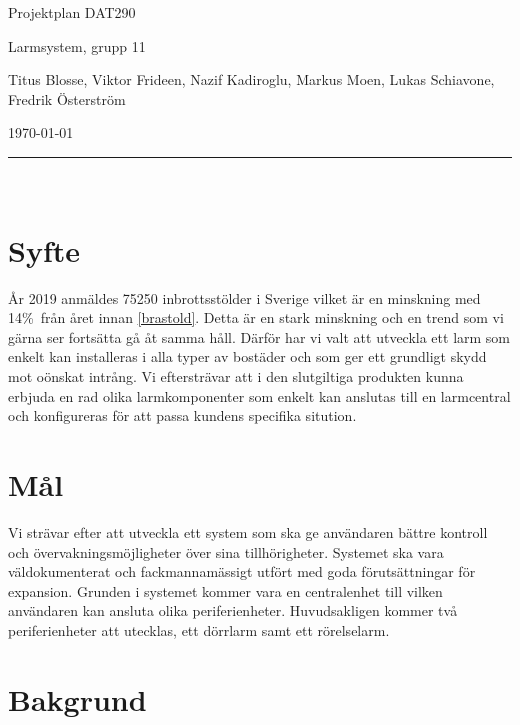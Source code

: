 \documentclass{article}
\begin{document}
\begin{center}
\thispagestyle{empty}
\parskip=14pt%
\vspace*{3\parskip}%

{\LARGE Projektplan DAT290}

{\large Larmsystem, grupp 11

Titus Blosse, Viktor Frideen, Nazif Kadiroglu, Markus Moen, Lukas Schiavone, Fredrik Österström

\today}


\rule{7cm}{0.4pt}\\
\end{center}
\newpage

\thispagestyle{empty}
\tableofcontents
\newpage


\section{Syfte}

År 2019 anmäldes 75250  inbrottsstölder i Sverige vilket är en minskning med 14\%\ från året innan \ref{brastold}. Detta är en stark minskning och en trend som vi gärna ser fortsätta gå åt samma håll. Därför har vi valt att utveckla ett larm som enkelt kan installeras i alla typer av bostäder och som ger ett grundligt skydd mot oönskat intrång. Vi eftersträvar att i den slutgiltiga produkten kunna erbjuda en rad olika larmkomponenter som enkelt kan anslutas till en larmcentral och konfigureras för att passa kundens specifika sitution.


\section{Mål}

Vi strävar efter att utveckla ett system som ska ge användaren bättre kontroll och övervakningsmöjligheter över sina tillhörigheter. Systemet ska vara väldokumenterat och fackmannamässigt utfört med goda förutsättningar för expansion. Grunden i systemet kommer vara en centralenhet till vilken användaren kan ansluta olika periferienheter. Huvudsakligen kommer två periferienheter att utecklas, ett dörrlarm samt ett rörelselarm.


\section{Bakgrund}
\end{document}
